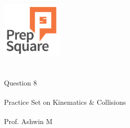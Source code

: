 \documentclass{beamer}
\begin{document}
\begin{center}
\ \\ \ \\
\includegraphics[width=30mm]{Logo-final.png} \\
\ \\ \ \\ 
{\huge Question 8 \\ \ \\ }
{\Large
Practice Set on Kinematics \& Collisions
}
{\large \ \\ \ \\ Prof. Ashwin M }
\end{center}
\end{document}
